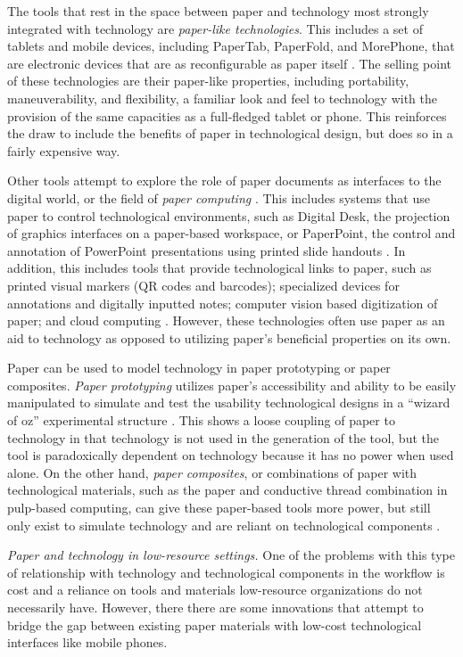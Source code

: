 \documentclass{sig-alternate}
\begin{document}
The tools that rest in the space between paper and technology most strongly integrated with technology are \emph{paper-like technologies}. This includes a set of tablets and mobile devices, including PaperTab, PaperFold, and MorePhone, that are electronic devices that are as reconfigurable as paper itself \cite{gomes2014,gomes2013,tarun2013}. The selling point of these technologies are their paper-like properties, including portability, maneuverability, and flexibility, a familiar look and feel to technology with the provision of the same capacities as a full-fledged tablet or phone. This reinforces the draw to include the benefits of paper in technological design, but does so in a fairly expensive way.

Other tools attempt to explore the role of paper documents as interfaces to the digital world, or the field of \emph{paper computing} \cite{kaplan2010}. This includes systems that use paper to control technological environments, such as Digital Desk, the projection of graphics interfaces on a paper-based workspace, or PaperPoint, the control and annotation of PowerPoint presentations using printed slide handouts \cite{newman1992,wellner1993,signer2007}. In addition, this includes tools that provide technological links to paper, such as printed visual markers (QR codes and barcodes); specialized devices for annotations and digitally inputted notes; computer vision based digitization of paper; and cloud computing \cite{kaplan2010,anoto,pietrzak2010}. However, these technologies often use paper as an aid to technology as opposed to utilizing paper's beneficial properties on its own. 

Paper can be used to model technology in paper prototyping or paper composites. \emph{Paper prototyping} utilizes paper's accessibility and ability to be easily manipulated to simulate and test the usability technological designs in a ``wizard of oz'' experimental structure \cite{synder2001,chandler2002}. This shows a loose coupling of paper to technology in that technology is not used in the generation of the tool, but the tool is paradoxically dependent on technology because it has no power when used alone. On the other hand, \emph{paper composites}, or combinations of paper with technological materials, such as the paper and conductive thread combination in pulp-based computing, can give these paper-based tools more power, but still only exist to simulate technology and are reliant on technological components \cite{coelho2009}.

\emph{Paper and technology in low-resource settings.} 
One of the problems with this type of relationship with technology and technological components in the workflow is cost and a reliance on tools and materials low-resource organizations do not necessarily have. However, there there are some innovations that attempt to bridge the gap between existing paper materials with low-cost technological interfaces like mobile phones.
\end{document}
